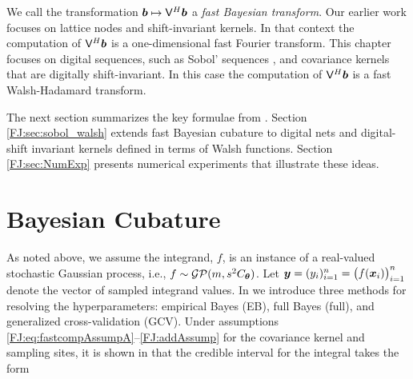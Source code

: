 \documentclass[graybox,footinfo]{svmult}
\begin{document}
We call the transformation ${\boldsymbol{b}} \mapsto \mathsf{V}^H {\boldsymbol{b}}$ a \emph{fast Bayesian transform}. Our earlier work \cite{RatHic19a} focuses on lattice nodes and shift-invariant kernels. In that context the computation of $\mathsf{V}^H {\boldsymbol{b}}$ is a one-dimensional fast Fourier transform.  This chapter focuses on digital sequences, such as Sobol' sequences \cite{Sob67}, and covariance kernels that are digitally shift-invariant.  In this case the computation of $\mathsf{V}^H {\boldsymbol{b}}$ is a fast Walsh-Hadamard transform. 



The next section summarizes the key formulae from \cite{RatHic19a}.  Section \ref{FJ:sec:sobol_walsh} extends fast Bayesian cubature to digital nets and digital-shift invariant kernels defined in terms of Walsh functions.  Section \ref{FJ:sec:NumExp} presents numerical experiments that illustrate these ideas.  




\section{Bayesian Cubature}
\label{FJ:sec:BC} 




As noted above, we assume the integrand, $f$, is an instance of a real-valued stochastic Gaussian process, i.e., $f \sim \mathcal{GP}(m,s^2 C_{\boldsymbol{\theta}})$.  Let $\boldsymbol{y} = (y_i)_{i=1}^n = \bigl( f({\boldsymbol{x}}_i) \bigr)_{i=1}^n$ denote the vector of sampled integrand values.  In \cite{RatHic19a} we introduce three methods for resolving the hyperparameters:  empirical Bayes (EB), full Bayes (full), and generalized cross-validation (GCV).  Under assumptions \eqref{FJ:eq:fastcompAssumpA}--\eqref{FJ:addAssump} for the covariance kernel and sampling sites, it is shown in \cite[Theorem 2]{RatHic19a} that the credible interval for the integral takes the form
\end{document}
